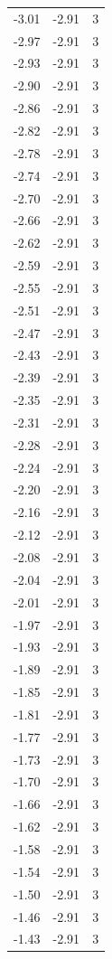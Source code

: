 \begin{longtable}{lrr}
  -3.01 & -2.91 & 3 \\
  -2.97 & -2.91 & 3 \\
  -2.93 & -2.91 & 3 \\
  -2.90 & -2.91 & 3 \\
  -2.86 & -2.91 & 3 \\
  -2.82 & -2.91 & 3 \\
  -2.78 & -2.91 & 3 \\
  -2.74 & -2.91 & 3 \\
  -2.70 & -2.91 & 3 \\
  -2.66 & -2.91 & 3 \\
  -2.62 & -2.91 & 3 \\
  -2.59 & -2.91 & 3 \\
  -2.55 & -2.91 & 3 \\
  -2.51 & -2.91 & 3 \\
  -2.47 & -2.91 & 3 \\
  -2.43 & -2.91 & 3 \\
  -2.39 & -2.91 & 3 \\
  -2.35 & -2.91 & 3 \\
  -2.31 & -2.91 & 3 \\
  -2.28 & -2.91 & 3 \\
  -2.24 & -2.91 & 3 \\
  -2.20 & -2.91 & 3 \\
  -2.16 & -2.91 & 3 \\
  -2.12 & -2.91 & 3 \\
  -2.08 & -2.91 & 3 \\
  -2.04 & -2.91 & 3 \\
  -2.01 & -2.91 & 3 \\
  -1.97 & -2.91 & 3 \\
  -1.93 & -2.91 & 3 \\
  -1.89 & -2.91 & 3 \\
  -1.85 & -2.91 & 3 \\
  -1.81 & -2.91 & 3 \\
  -1.77 & -2.91 & 3 \\
  -1.73 & -2.91 & 3 \\
  -1.70 & -2.91 & 3 \\
  -1.66 & -2.91 & 3 \\
  -1.62 & -2.91 & 3 \\
  -1.58 & -2.91 & 3 \\
  -1.54 & -2.91 & 3 \\
  -1.50 & -2.91 & 3 \\
  -1.46 & -2.91 & 3 \\
  -1.43 & -2.91 & 3 \\

\end{longtable}
